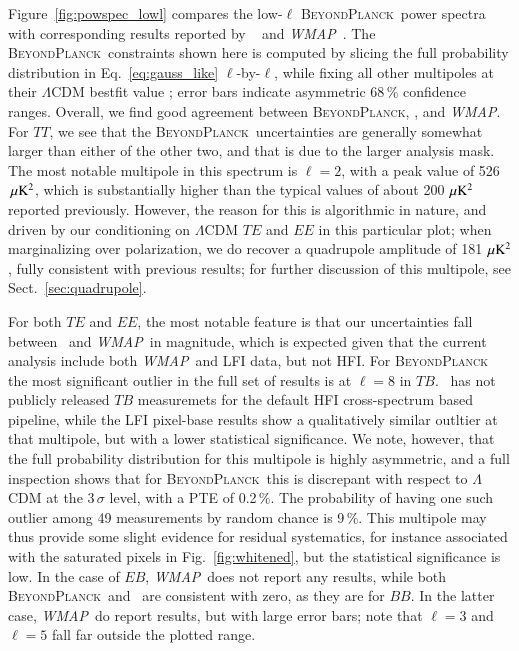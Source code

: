 \documentclass[twocolumn]{aa}
\def\WMAP{\textit{WMAP}}
\newcommand{\red}[0]{\color{red}}
\newcommand{\BP}{\textsc{BeyondPlanck}}
\begin{document}
Figure~\ref{fig:powspec_lowl} compares the low-$\ell$ \BP\ power
spectra with corresponding results reported by
\Planck\ \citep{planck2016-l05} and \WMAP\ \citep{hinshaw2012}. The
\BP\ constraints shown here is computed by slicing the full
probability distribution in Eq.~\eqref{eq:gauss_like}
$\ell$-by-$\ell$, while fixing all other {\red multipoles at their ${\Lambda}\mathrm{CDM}$ bestfit value \citep{planck2016-l06}}; error bars indicate asymmetric 68\,\% confidence
ranges. Overall, we find good agreement between \BP, \Planck, and
\WMAP. For $TT$, we see that the \BP\ uncertainties are generally
somewhat larger than either of the other two, and that is due to the
larger analysis mask. The most notable multipole in this spectrum is
$\ell=2$, with a peak value of 526\,$\muK^2$, which is substantially
higher than the typical values of about 200\,$\muK^2$ reported
previously. However, the reason for this is algorithmic in nature, and
driven by our conditioning on $\Lambda$CDM $TE$ and $EE$ in this
particular plot; when marginalizing over polarization, we do recover a
quadrupole amplitude of 181\,$\muK^2$, fully consistent with previous
results; for further discussion of this multipole, see
Sect.~\ref{sec:quadrupole}.

For both $TE$ and $EE$, the most notable feature is that our
uncertainties fall between \Planck\ and \WMAP\ in magnitude, which is
expected given that the current analysis include both \WMAP\ and LFI
data, but not HFI. For \BP\, the most significant outlier in the full set of results is at $\ell=8$ in $TB$. \Planck\ has not publicly released $TB$ measuremets for the default HFI cross-spectrum based pipeline, while the LFI pixel-base results show a qualitatively similar outltier at that multipole, but with a lower statistical significance.  We note,
however, that the full probability distribution for this multipole is
highly asymmetric, and a full inspection shows that for \BP\ this is discrepant
with respect to $\Lambda$CDM at the $3\,\sigma$ level, with a PTE of
0.2\,\%. The probability of having one such outlier among 49
measurements by random chance is 9\,\%. This multipole may thus
provide some slight evidence for residual systematics, for instance
associated with the saturated pixels in Fig.~\ref{fig:whitened}, but
the statistical significance is low. In the case of $EB$, \WMAP\ does
not report any results, while both \BP\ and \Planck\ are consistent
with zero, as they are for $BB$. In the latter case, \WMAP\ do report
results, but with large error bars; note that $\ell=3$  and $\ell=5$ fall far
outside the plotted range.
\end{document}
